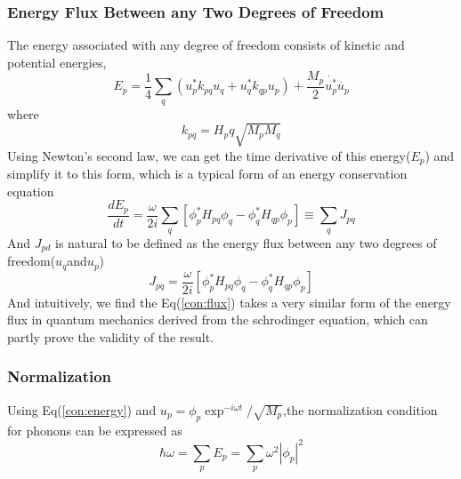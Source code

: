 \subsubsection{Energy Flux Between any Two Degrees of Freedom}
The energy associated with any degree of freedom consists of kinetic and potential energies,
\begin{equation}
E_p=\frac{1}{4}\sum_q (u_p^*k_{pq}u_q+u_q^*k_{qp}u_p)+\frac{M_p}{2}\dot{u_p^*}\dot{u_p}\label{con:energy}
\end{equation}
where
\begin{equation}
k_{pq}=H_pq\sqrt{M_p M_q}
\end{equation}
Using Newton's second law, we can get the time derivative of this energy($E_p$) and simplify it to this form, which is a typical form of an energy conservation equation
\begin{equation}
\frac{d E_p}{d t}=\frac{\omega}{2 i}\sum_q[\phi_p^* H_{pq} \phi_q - \phi_q^* H_{qp} \phi_p]\equiv \sum_q J_{pq}
\end{equation}
And $J_{pd}$ is natural to be defined as the energy flux between any two degrees of freedom($u_q$and$u_p$)
\begin{equation}
J_{pq}=\frac{\omega}{2 i}[\phi_p^* H_{pq} \phi_q - \phi_q^* H_{qp} \phi_p]\label{con:flux}
\end{equation}
And intuitively, we find the Eq(\ref{con:flux}) takes a very similar form of the energy flux in quantum mechanics derived from the schrodinger equation, which can partly prove the validity of the result. 
\subsubsection*{Normalization}
Using Eq(\ref{con:energy}) and $u_p=\phi_p \exp^{-i\omega t} /\sqrt{M_p}$,the normalization condition for phonons can be expressed as
\begin{equation}
\hbar \omega = \sum_p E_p = \sum_p \omega^2 |\phi_p|^2
\end{equation}
